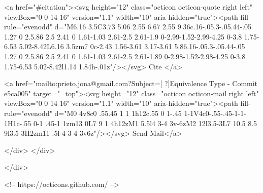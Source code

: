       <a  href="#citation"><svg height="12" class="octicon octicon-quote right left" viewBox="0 0 14 16" version="1.1" width="10" aria-hidden="true"><path fill-rule="evenodd" d="M6.16 3.5C3.73 5.06 2.55 6.67 2.55 9.36c.16-.05.3-.05.44-.05 1.27 0 2.5.86 2.5 2.41 0 1.61-1.03 2.61-2.5 2.61-1.9 0-2.99-1.52-2.99-4.25 0-3.8 1.75-6.53 5.02-8.42L6.16 3.5zm7 0c-2.43 1.56-3.61 3.17-3.61 5.86.16-.05.3-.05.44-.05 1.27 0 2.5.86 2.5 2.41 0 1.61-1.03 2.61-2.5 2.61-1.89 0-2.98-1.52-2.98-4.25 0-3.8 1.75-6.53 5.02-8.42l1.14 1.84h-.01z"/></svg> Cite
      </a>

      <a href="mailto:prieto.jona@gmail.com?Subject=[ ?]Equivalence Type - Commit e5ca005" target="_top"><svg height="12" class="octicon octicon-mail right left" viewBox="0 0 14 16" version="1.1" width="10" aria-hidden="true"><path fill-rule="evenodd" d="M0 4v8c0 .55.45 1 1 1h12c.55 0 1-.45 1-1V4c0-.55-.45-1-1-1H1c-.55 0-1 .45-1 1zm13 0L7 9 1 4h12zM1 5.5l4 3-4 3v-6zM2 12l3.5-3L7 10.5 8.5 9l3.5 3H2zm11-.5l-4-3 4-3v6z"/></svg> Send Mail</a>

    </div>
  </div>

</div>

<!-- https://octicons.github.com/ -->





